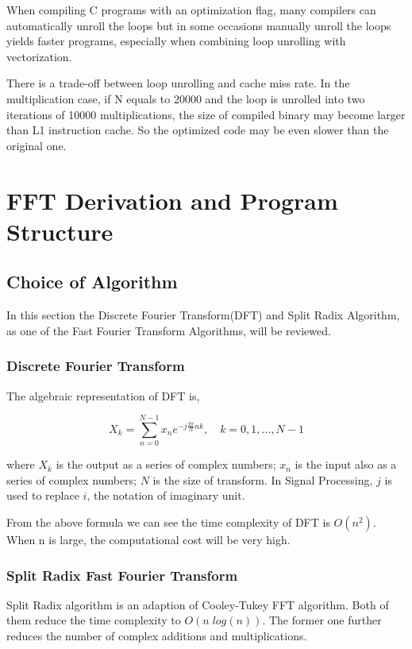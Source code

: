 \documentclass[a4paper]{report}
\begin{document}
	When compiling C programs with an optimization flag, many compilers can automatically unroll the loops but in some occasions manually unroll the loops yields faster programs, especially when combining loop unrolling with vectorization.

	There is a trade-off between loop unrolling and cache miss rate. In the multiplication case, if N equals to 20000 and the loop is unrolled into two iterations of 10000 multiplications, the size of compiled binary may become larger than L1 instruction cache. So the optimized code may be even slower than the original one.

\chapter{FFT Derivation and Program Structure}

\section{Choice of Algorithm} \indent

	In this section the Discrete Fourier Transform(DFT) and Split Radix Algorithm, as one of the Fast Fourier Transform Algorithms, will be reviewed.

\subsection{Discrete Fourier Transform} \indent

	The algebraic representation of DFT is,
	
	\[X_k = \sum^{N-1}_{n=0} x_n e^{-j\frac{2\pi}{N}nk}, \quad k = 0, 1, ..., N-1\]
	
	where $X_k$ is the output as a series of complex numbers; $x_n$ is the input also as a series of complex numbers; $N$ is the size of transform. In Signal Processing, $j$ is used to replace $i$, the notation of imaginary unit.
	
	From the above formula we can see the time complexity of DFT is $O(n^2)$. When n is large, the computational cost will be very high.

\subsection{Split Radix Fast Fourier Transform} \indent

	Split Radix algorithm\cite{1984split} is an adaption of Cooley-Tukey FFT algorithm\cite{cooley}. Both of them reduce the time complexity to $O(n\;log(n))$. The former one further reduces the number of complex additions and multiplications.
	
\end{document}
